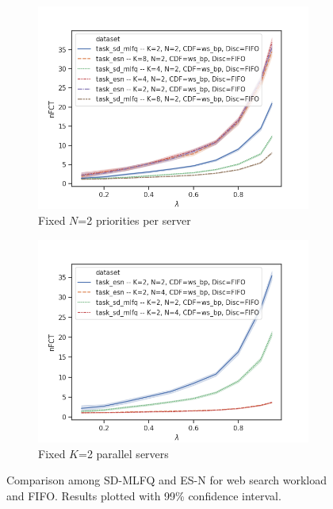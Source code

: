 \begin{figure}
	\centering
	\captionsetup{width=.8\linewidth}
	\begin{subfigure}{.5\textwidth}
		\centering
		\includegraphics[width=0.99\textwidth]{Chapter3/Figures/comparison_esn_vs_mlfq_fifo_vs_servers}
		\caption{Fixed $N$=2 priorities per server}
		\label{fig:esn-vs-sdmlfq-fifo-fixed-N}
	\end{subfigure}%
	\hfill
	\begin{subfigure}{.5\textwidth}
		\centering
		\includegraphics[width=0.99\textwidth]{Chapter3/Figures/comparison_esn_vs_mlfq_fifo}
		\caption{Fixed $K$=2 parallel servers}
		\label{fig:esn-vs-sdmlfq-fifo-fixed-K}
	\end{subfigure}%
	\caption{Comparison among SD-MLFQ and ES-N for web search workload and FIFO. Results plotted with 99\% confidence interval.}
\end{figure}%

